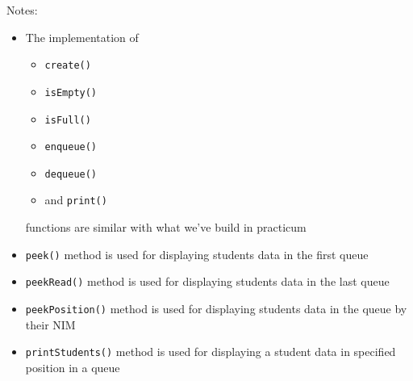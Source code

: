 \documentclass[12pt,titlepage]{article}
\begin{document}
\begin{enumerate}
{        Notes:
        \begin{itemize}
            \item {
                The implementation of 
                \begin{itemize}
                    \item \texttt{create()}
                    \item \texttt{isEmpty()} 
                    \item \texttt{isFull()}
                    \item \texttt{enqueue()}
                    \item \texttt{dequeue()}
                    \item and \texttt{print()}
                \end{itemize}
                functions are similar with what we've build in practicum
            }
            \item {
                \texttt{peek()} method is used for displaying students data in the first queue
            }
            \item {
                \texttt{peekRead()} method is used for displaying students data in the last queue
            }
            \item {
                \texttt{peekPosition()} method is used for displaying students data in the queue by their NIM
            }
            \item {
                \texttt{printStudents()} method is used for displaying a student data in specified position in a queue
            }
        \end{itemize}
    }
\end{enumerate}
\end{document}
